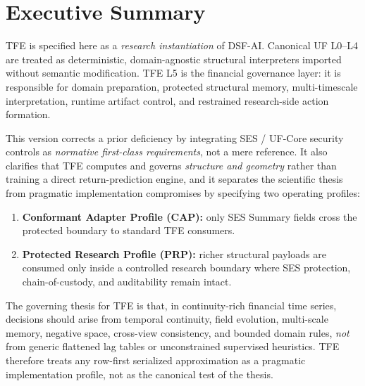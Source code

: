 \documentclass[11pt]{report}
\begin{document}
\tableofcontents
\clearpage

\chapter*{Executive Summary}
TFE is specified here as a \emph{research instantiation} of DSF-AI. Canonical UF L0--L4 are treated as deterministic, domain-agnostic structural interpreters imported without semantic modification. TFE L5 is the financial governance layer: it is responsible for domain preparation, protected structural memory, multi-timescale interpretation, runtime artifact control, and restrained research-side action formation.

This version corrects a prior deficiency by integrating SES / UF-Core security controls as \emph{normative first-class requirements}, not a mere reference. It also clarifies that TFE computes and governs \emph{structure and geometry} rather than training a direct return-prediction engine, and it separates the scientific thesis from pragmatic implementation compromises by specifying two operating profiles:
\begin{enumerate}[leftmargin=1.2cm]
    \item \textbf{Conformant Adapter Profile (CAP):} only SES Summary fields cross the protected boundary to standard TFE consumers.
    \item \textbf{Protected Research Profile (PRP):} richer structural payloads are consumed only inside a controlled research boundary where SES protection, chain-of-custody, and auditability remain intact.
\end{enumerate}

The governing thesis for TFE is that, in continuity-rich financial time series, decisions should arise from temporal continuity, field evolution, multi-scale memory, negative space, cross-view consistency, and bounded domain rules, \emph{not} from generic flattened lag tables or unconstrained supervised heuristics. TFE therefore treats any row-first serialized approximation as a pragmatic implementation profile, not as the canonical test of the thesis.
\end{document}
